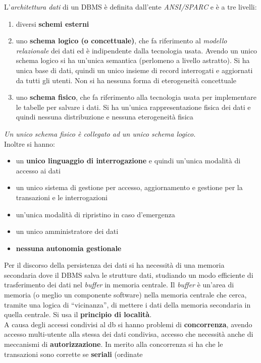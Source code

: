 \documentclass[a4paper,12pt, oneside]{book}
\begin{document}
L'\textit{architettura dati} di un DBMS è definita dall'ente \textit{ANSI/SPARC}
e è a tre livelli:
\begin{enumerate}
  \item diversi \textbf{schemi esterni}
  \item uno \textbf{schema logico (o concettuale)}, che fa riferimento al
  \textit{modello relazionale} dei dati ed è indipendente dalla tecnologia
  usata. Avendo un unico schema logico si ha un'unica semantica (perlomeno a
  livello astratto). Si ha unica base di dati, quindi un unico insieme di record
  interrogati e aggiornati da tutti gli utenti. Non si ha nessuna forma di
  eterogeneità concettuale 
  \item uno \textbf{schema fisico}, che fa riferimento alla tecnologia usata per
  implementare le tabelle per salvare i dati. Si ha un'unica rappresentazione
  fisica dei dati e quindi nessuna distribuzione e nessuna eterogeneità fisica
\end{enumerate}
\textit{Un unico schema fisico è collegato ad un unico schema logico.}\\
Inoltre si hanno:
\begin{itemize}
  \item un \textbf{unico linguaggio di interrogazione} e quindi un'unica
  modalità di accesso ai dati
  \item un unico sistema di gestione per accesso, aggiornamento e gestione per
  la transazioni e le interrogazioni
  \item un'unica modalità di ripristino in caso d'emergenza
  \item un unico amministratore dei dati
  \item \textbf{nessuna autonomia gestionale}
\end{itemize}
Per il discorso della persistenza dei dati si ha necessità di una memoria
secondaria dove il DBMS salva le strutture dati, studiando un modo efficiente di
trasferimento dei dati nel \textit{buffer} in memoria centrale. Il
\textit{buffer} è un'area di memoria (o meglio un componente software) nella
memoria centrale che cerca, tramite una logica di ``vicinanza'', di mettere i
dati della memoria secondaria in quella centrale. Si usa il \textbf{principio di
  località}.\\
A causa degli accessi condivisi al db si hanno problemi di \textbf{concorrenza},
avendo accesso multi-utente alla stessa dei dati condivisa, accesso che
necessità anche di meccanismi di \textbf{autorizzazione}. In merito alla
concorrenza si ha che le transazioni sono corrette se \textbf{seriali} (ordinate
\end{document}
